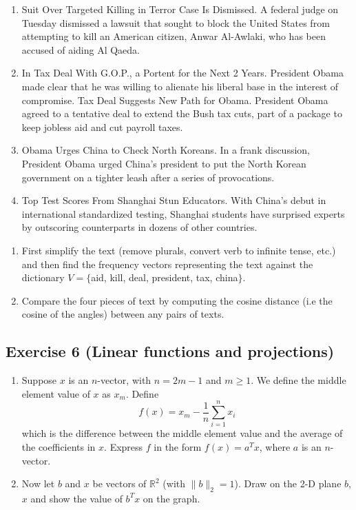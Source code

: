 \documentclass[11pt]{article}
\begin{document}
\begin{enumerate}[label=(\alph*)]
    \item Suit Over Targeted Killing in Terror Case Is Dismissed. A federal judge on Tuesday dismissed a lawsuit that sought to block the United States from attempting to kill an American citizen, Anwar Al-Awlaki, who has been accused of aiding Al Qaeda.
    
    \item In Tax Deal With G.O.P., a Portent for the Next 2 Years. President Obama made clear that he was willing to alienate his liberal base in the interest of compromise. Tax Deal Suggests New Path for Obama. President Obama agreed to a tentative deal to extend the Bush tax cuts, part of a package to keep jobless aid and cut payroll taxes.
    
    \item Obama Urges China to Check North Koreans. In a frank discussion, President Obama urged China's president to put the North Korean government on a tighter leash after a series of provocations.
    
    \item Top Test Scores From Shanghai Stun Educators. With China's debut in international standardized testing, Shanghai students have surprised experts by outscoring counterparts in dozens of other countries.
\end{enumerate}

\begin{enumerate}
    \item
    First simplify the text (remove plurals, convert verb to infinite tense, etc.) and then find the frequency vectors   representing the text against the dictionary $V=\{$aid, kill, deal, president, tax, china$\}$.
    
    \item Compare the four pieces of text by computing the cosine distance (i.e the cosine of the angles) between any pairs of texts. 
\end{enumerate}

\begin{solution}
\end{solution}

\newpage
\subsection*{Exercise 6 (Linear functions and projections)}

\begin{enumerate}
    \item Suppose $x$ is an $n$-vector, with $n = 2m - 1$ and $m \geq 1$. We define the middle element value of $x$ as $x_m$. Define $$f(x) = x_m - \frac{1}{n}\sum_{i = 1}^n x_i$$ which is the difference between the middle element value and the average of the coefficients in $x$. Express $f$ in the form $f(x) = a^Tx$, where $a$ is an $n$-vector.
    
    \item Now let $b$ and $x$ be vectors of $\mathbb{R}^2$ (with $\|b\|_2 = 1$). Draw on the 2-D plane $b$, $x$ and show the value of $b^Tx$ on the graph. 
\end{enumerate}
\end{document}

